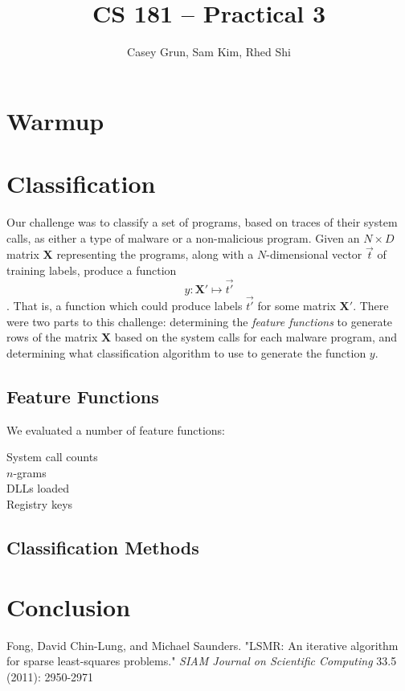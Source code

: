 \documentclass[11pt]{amsart}
\title{CS 181 -- Practical 3}
\author{Casey Grun, Sam Kim, Rhed Shi}
\newcommand{\mat}[1]{\mathbf{#1}}
\begin{document}
\maketitle

\section{Warmup}


\section{Classification}

Our challenge was to classify a set of programs, based on traces of their system calls, as either a type of malware or a non-malicious program. Given an $N \times D$ matrix $\mat{X}$ representing the programs, along with a $N$-dimensional vector $\vec{t}$ of training labels, produce a function 
$$y : \mat{X'} \mapsto \vec{t'}$$.
That is, a function which could produce labels $\vec{t'}$ for some matrix $\mat{X'}$. There were two parts to this challenge: determining the \emph{feature functions} to generate rows of the matrix $\mat{X}$ based on the system calls for each malware program, and determining what classification algorithm to use to generate the function $y$.

\subsection{Feature Functions}

We evaluated a number of feature functions:
\begin{description}
  \item[System call counts]
  \item[$n$-grams]
  \item[DLLs loaded]
  \item[Registry keys]
\end{description}

\subsection{Classification Methods}



\section{Conclusion}


\begingroup
\begin{thebibliography}{9}

Fong, David Chin-Lung, and Michael Saunders. "LSMR: An iterative algorithm for sparse least-squares problems."
\emph{SIAM Journal on Scientific Computing} 33.5 (2011): 2950-2971

\end{thebibliography}
\endgroup
\end{document}
